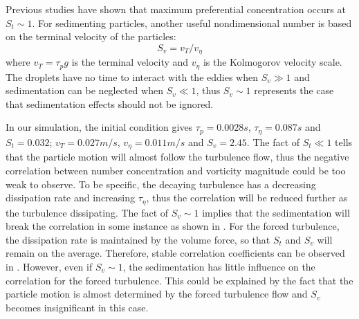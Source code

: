 \documentclass[draft,jgrga]{AGUTeX}
\begin{document}
\begin{article}
Previous studies \cite{grabowski1999comments,vaillancourt2000review} have shown that maximum preferential concentration occurs at $S_t \sim 1$. For sedimenting particles, another useful nondimensional number is based on the terminal velocity of the particles:
\begin{equation}
S_v = v_T/v_{\eta}
\end{equation}
where $v_T = \tau_p g$ is the terminal velocity and $v_{\eta}$ is the Kolmogorov velocity scale. The droplets have no time to interact with the eddies when $S_v \gg 1$ and sedimentation can be neglected when $S_v \ll 1$, thus $S_v \sim 1$ represents the case that sedimentation effects should not be ignored.

In our simulation, the initial condition gives $\tau_p = 0.0028 s$, $\tau_\eta = 0.087s$ and $S_t = 0.032$; $v_T = 0.027 m/s$, $v_{\eta} = 0.011 m/s$ and $S_v = 2.45$. The fact of $S_t \ll 1$ tells that the particle motion will 
almost follow the turbulence flow, thus the negative correlation between number concentration and vorticity 
magnitude could be too weak to observe. To be specific, the decaying turbulence has a decreasing dissipation rate 
and increasing $\tau_{\eta}$, thus the correlation will be reduced further as the turbulence dissipating. The fact of $S_v \sim 1$ implies that the sedimentation will break the correlation in some instance as shown in . For the forced turbulence, the dissipation rate is maintained by the volume force, so that $S_t$ and $S_v$ will remain on the average. Therefore, stable correlation coefficients can be observed in . However, even if $S_v \sim 1$, the sedimentation has little influence on the correlation for the forced turbulence. This could be explained by the fact that the particle motion is almost determined by the forced turbulence flow and $S_v$ becomes insignificant in this case.   


\end{article}
\end{document}
